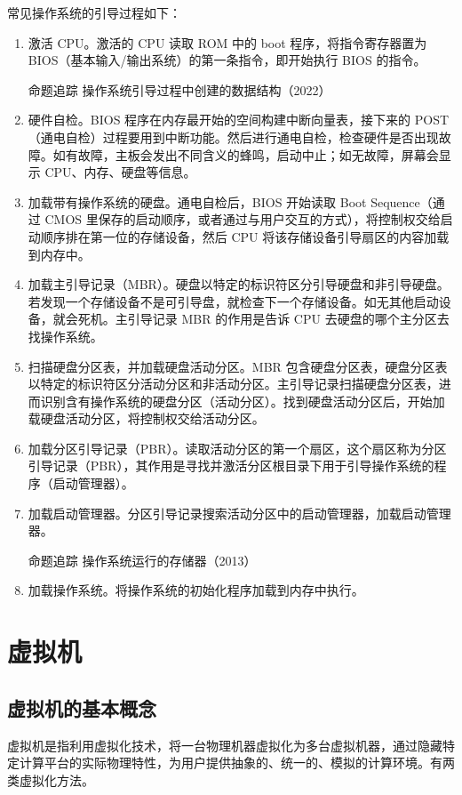 \documentclass{ctexbook}
\begin{document}
		常见操作系统的引导过程如下：
		\begin{enumerate}
			\item 激活 CPU。激活的 CPU 读取 ROM 中的 boot 程序，将指令寄存器置为 BIOS（基本输入/输出系统）的第一条指令，即开始执行 BIOS 的指令。
		
			\colorbox{gray!20}{命题追踪 \enspace 操作系统引导过程中创建的数据结构（2022）}
			
			\item 硬件自检。BIOS 程序在内存最开始的空间构建中断向量表，接下来的 POST（通电自检）过程要用到中断功能。然后进行通电自检，检查硬件是否出现故障。如有故障，主板会发出不同含义的蜂鸣，启动中止；如无故障，屏幕会显示 CPU、内存、硬盘等信息。
			\item 加载带有操作系统的硬盘。通电自检后，BIOS 开始读取 Boot Sequence（通过 CMOS 里保存的启动顺序，或者通过与用户交互的方式），将控制权交给启动顺序排在第一位的存储设备，然后 CPU 将该存储设备引导扇区的内容加载到内存中。
			\item 加载主引导记录（MBR）。硬盘以特定的标识符区分引导硬盘和非引导硬盘。若发现一个存储设备不是可引导盘，就检查下一个存储设备。如无其他启动设备，就会死机。主引导记录 MBR 的作用是告诉 CPU 去硬盘的哪个主分区去找操作系统。
			\item 扫描硬盘分区表，并加载硬盘活动分区。MBR 包含硬盘分区表，硬盘分区表以特定的标识符区分活动分区和非活动分区。主引导记录扫描硬盘分区表，进而识别含有操作系统的硬盘分区（活动分区）。找到硬盘活动分区后，开始加载硬盘活动分区，将控制权交给活动分区。
			\item 加载分区引导记录（PBR）。读取活动分区的第一个扇区，这个扇区称为分区引导记录（PBR），其作用是寻找并激活分区根目录下用于引导操作系统的程序（启动管理器）。
			\item 加载启动管理器。分区引导记录搜索活动分区中的启动管理器，加载启动管理器。
	
		\colorbox{gray!20}{命题追踪 \enspace 操作系统运行的存储器（2013）}
			
			\item 加载操作系统。将操作系统的初始化程序加载到内存中执行。
		\end{enumerate}
		
		\section{虚拟机}
		\subsection{虚拟机的基本概念}
		虚拟机是指利用虚拟化技术，将一台物理机器虚拟化为多台虚拟机器，通过隐藏特定计算平台的实际物理特性，为用户提供抽象的、统一的、模拟的计算环境。有两类虚拟化方法。
		
\end{document}
